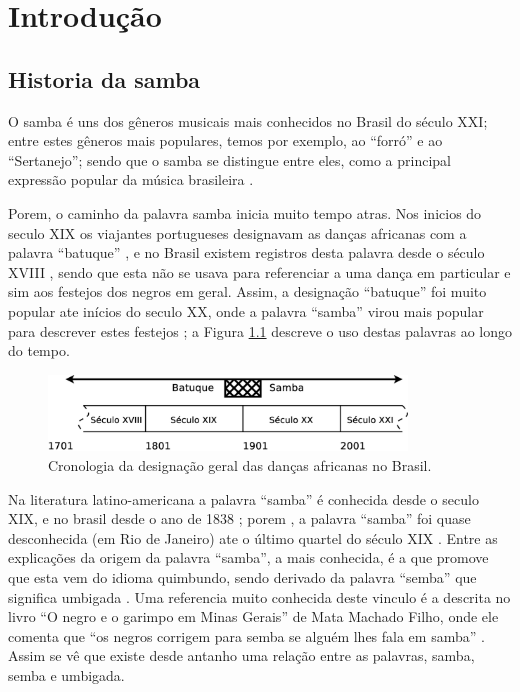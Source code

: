 
\chapter{Introdução}
\section{Historia da samba}
O samba é uns dos gêneros musicais mais conhecidos no Brasil do século XXI;
entre estes gêneros mais populares, temos por exemplo, ao ``forró'' e ao ``Sertanejo'';
sendo que o samba se distingue entre eles, 
como a principal expressão popular da música brasileira \cite[pp. 47]{diniz2008almanaque}. 


Porem, o caminho da palavra samba inicia muito tempo atras.
Nos inicios do seculo XIX os viajantes portugueses designavam as danças africanas com a palavra ``batuque'' \cite[pp. 54]{de4danccas},
e no Brasil existem registros desta palavra desde o século XVIII \cite[pp. 85]{sandroni2001feitico} , sendo que
esta não se usava para referenciar a uma dança em particular e sim aos festejos dos negros em geral.
Assim, a designação  ``batuque'' foi muito popular ate inícios do seculo XX, 
onde a palavra ``samba'' virou mais popular para descrever estes festejos \cite[pp. 85]{sandroni2001feitico} \cite[pp. 47]{diniz2008almanaque}; 
a Figura \ref{fig:sambacrono} descreve o uso destas palavras ao longo do tempo.
\begin{figure}[h]
  \centering
    \includegraphics[width=0.85\textwidth]{chapters/cap-intro/samba-crono.eps}
  \caption{Cronologia da designação geral das danças africanas no Brasil.}
  \label{fig:sambacrono}
\end{figure}

Na literatura latino-americana a palavra ``samba'' é conhecida desde o seculo XIX, 
e no brasil desde o ano de 1838 \cite[pp. 47]{diniz2008almanaque}; porem , a palavra ``samba'' foi
quase desconhecida (em Rio de Janeiro) ate o último quartel do século XIX  \cite[pp. 86]{sandroni2001feitico}.
Entre as explicações da origem da palavra ``samba'', 
a mais conhecida, é a que promove que esta vem do idioma quimbundo, 
sendo derivado da palavra ``semba''  que significa umbigada \cite[pp. 47]{diniz2008almanaque} \cite[pp. 50]{da2015historia}.
Uma referencia muito conhecida deste vinculo é a descrita no livro ``O negro e o garimpo em Minas Gerais''
de Mata Machado Filho, onde ele comenta que ``os negros corrigem para semba se 
alguém lhes fala em samba'' \cite[pp. 85]{sandroni2001feitico}. Assim se vê que existe
desde antanho uma relação entre as palavras, 
samba, semba e umbigada.


